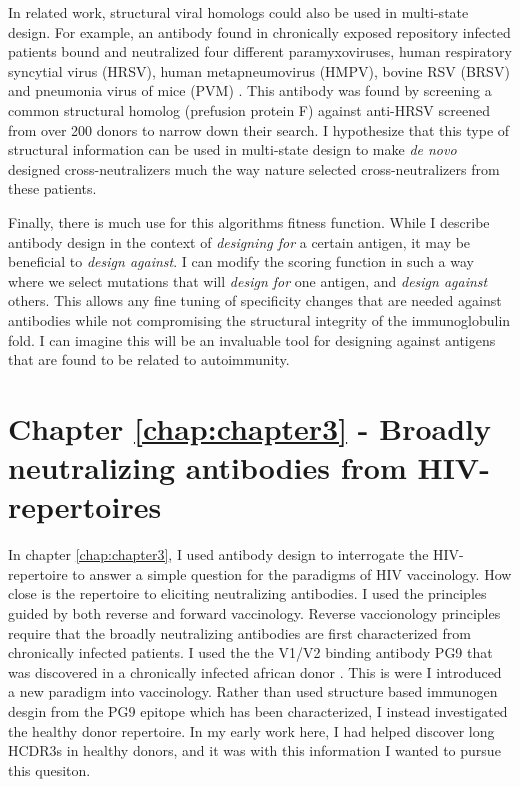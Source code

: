 In related work, structural viral homologs could also be used in multi-state design. For example, an antibody found in chronically exposed repository infected patients bound and neutralized four different paramyxoviruses, human respiratory syncytial virus (HRSV), human metapneumovirus (HMPV), bovine RSV (BRSV) and pneumonia virus of mice (PVM) \citep{Corti:2013cv}. This antibody was found by screening a common structural homolog (prefusion protein F) against anti-HRSV screened from over 200 donors to narrow down their search. I hypothesize that this type of structural information can be used in multi-state design to make \textit{de novo} designed cross-neutralizers much the way nature selected cross-neutralizers from these patients.

Finally, there is much use for this algorithms fitness function. While I describe antibody design in the context of \textit{designing for} a certain antigen, it may be beneficial to \textit{design against}. I can modify the scoring function in such a way where we select mutations that will \textit{design for} one antigen, and \textit{design against} others. This allows any fine tuning of specificity changes that are needed against antibodies while not compromising the structural integrity of the immunoglobulin fold. I can imagine this will be an invaluable tool for designing against antigens that are found to be related to autoimmunity.

\section{Chapter \ref{chap:chapter3} - Broadly neutralizing antibodies from HIV-\naive repertoires}
In chapter \ref{chap:chapter3}, I used antibody design to interrogate the HIV-\naive repertoire to answer a simple question for the paradigms of HIV vaccinology. How close is the \naive repertoire to eliciting neutralizing antibodies. I used the principles guided by both reverse  and forward vaccinology\citep{Burton:2012bh}. Reverse vaccionology principles require that the broadly neutralizing antibodies are first characterized from chronically infected patients. I used the the V1/V2 binding antibody PG9 that was discovered in a chronically infected african donor \citep{McLellan:2011dg,Walker:2009cd}. This is were I introduced a new paradigm into vaccinology. Rather than used structure based immunogen desgin from the PG9 epitope which has been characterized, I instead investigated the healthy donor repertoire. In my early work here, I had helped discover long HCDR3s in healthy donors, and it was with this information I wanted to pursue this quesiton.

